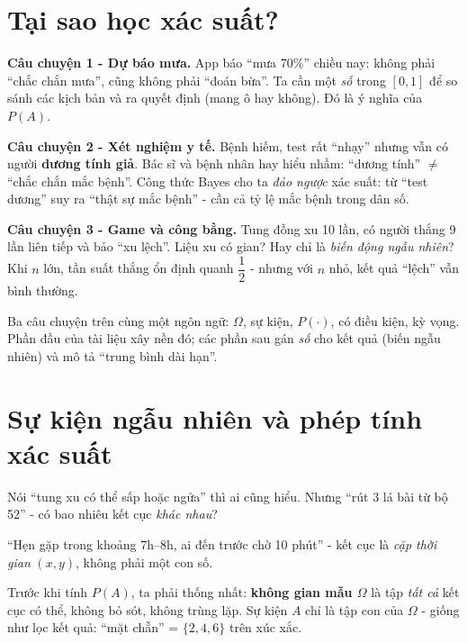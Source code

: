 \documentclass[12pt,a4paper]{article}
\begin{document}

\newpage
\tableofcontents
\newpage



\section*{Tại sao học xác suất?}

\begin{dongco}[title={Động cơ học - Ba tình huống quen thuộc}]
\textbf{Câu chuyện 1 - Dự báo mưa.} App báo ``mưa 70\%'' chiều nay: không phải ``chắc chắn mưa'', cũng không phải ``đoán bừa''. Ta cần một \emph{số} trong $[0,1]$ để so sánh các kịch bản và ra quyết định (mang ô hay không). Đó là ý nghĩa của $P(A)$.

\medskip
\textbf{Câu chuyện 2 - Xét nghiệm y tế.} Bệnh hiếm, test rất ``nhạy'' nhưng vẫn có người \textbf{dương tính giả}. Bác sĩ và bệnh nhân hay hiểu nhầm: ``dương tính'' $\not=$ ``chắc chắn mắc bệnh''. Công thức Bayes cho ta \emph{đảo ngược} xác suất: từ ``test dương'' suy ra ``thật sự mắc bệnh'' - cần cả tỷ lệ mắc bệnh trong dân số.

\medskip
\textbf{Câu chuyện 3 - Game và công bằng.} Tung đồng xu 10 lần, có người thắng 9 lần liên tiếp và bảo ``xu lệch''. Liệu xu có gian? Hay chỉ là \emph{biến động ngẫu nhiên}? Khi $n$ lớn, tần suất thắng ổn định quanh $\dfrac{1}{2}$ - nhưng với $n$ nhỏ, kết quả ``lệch'' vẫn bình thường.

\medskip
Ba câu chuyện trên cùng một ngôn ngữ: $\Omega$, sự kiện, $P(\cdot)$, có điều kiện, kỳ vọng. Phần đầu của tài liệu xây nền đó; các phần sau gán \emph{số} cho kết quả (biến ngẫu nhiên) và mô tả ``trung bình dài hạn''.
\end{dongco}

\newpage

\section{Sự kiện ngẫu nhiên và phép tính xác suất}

\begin{dongco}[title={Động cơ học -- Liệt kê hết mọi khả năng}]
Nói ``tung xu có thể sấp hoặc ngửa'' thì ai cũng hiểu. Nhưng ``rút 3 lá bài từ bộ 52'' - có bao nhiêu kết cục \emph{khác nhau}?

``Hẹn gặp trong khoảng 7h--8h, ai đến trước chờ 10 phút'' - kết cục là \emph{cặp thời gian} $(x,y)$, không phải một con số.

Trước khi tính $P(A)$, ta phải thống nhất: \textbf{không gian mẫu $\Omega$} là tập \emph{tất cả} kết cục có thể, không bỏ sót, không trùng lặp. Sự kiện $A$ chỉ là tập con của $\Omega$ - giống như lọc kết quả: ``mặt chẵn'' = $\{2,4,6\}$ trên xúc xắc.
\end{dongco}
\end{document}
